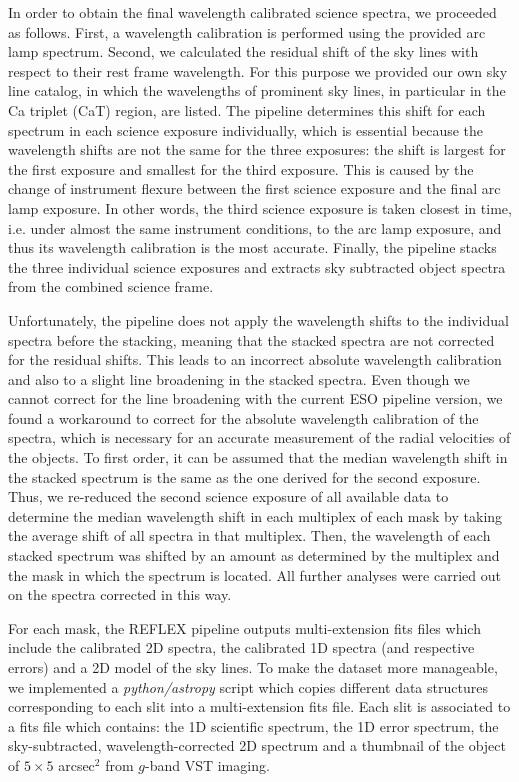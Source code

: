 \documentclass[useAMS,usenatbib]{mn2e}
\begin{document}
In order to obtain the final wavelength calibrated science spectra, we 
proceeded as follows. First, a wavelength calibration 
is performed using the provided arc lamp spectrum. Second, we calculated
the residual shift of the sky lines with respect to their rest frame 
wavelength. For this purpose we provided our own sky line catalog, in which 
the wavelengths of prominent sky lines, in particular in the Ca triplet (CaT)
region, are listed. The pipeline determines this shift for each spectrum in 
each science exposure individually, which is essential because the wavelength 
shifts are not the same for the three exposures: the shift is largest for the 
first exposure and smallest for the third exposure. This 
is caused by the 
change of instrument flexure between the first science exposure and the final 
arc lamp exposure. In other words, the third science exposure is taken 
closest in time, i.e. under almost the same instrument conditions, to the arc 
lamp exposure, and thus its wavelength calibration is the most accurate. 
Finally, the pipeline stacks the three individual science exposures and 
extracts sky subtracted object spectra from the combined science frame.

Unfortunately, the pipeline does not apply the wavelength 
shifts to the individual spectra before the stacking, meaning that the stacked
spectra are not corrected for the residual shifts. This leads to an incorrect
absolute wavelength calibration and also to a slight line broadening in the 
stacked spectra. Even though we cannot correct for the line broadening with
the current ESO pipeline version, we found a workaround to correct for the
absolute wavelength calibration of the spectra, which is necessary for an 
accurate measurement of the radial velocities of the objects. To first order, 
it can be assumed that the median wavelength shift in the stacked spectrum is 
the same as the one derived for the second exposure. Thus, we re-reduced the 
second science exposure of all available data to determine the median 
wavelength shift in each multiplex of each mask by taking the average shift 
of all spectra in that multiplex. Then, the wavelength of each stacked 
spectrum was shifted by an amount as determined by the multiplex and the mask
in which the spectrum is located. All further analyses were carried out 
on the spectra corrected in this way.

For each mask, the REFLEX pipeline outputs multi-extension fits files which 
include the calibrated 2D spectra, the calibrated 1D spectra (and respective 
errors) and a 2D model of the sky lines. To make the dataset more manageable, 
we implemented a {\it python/astropy} script which copies different data structures 
corresponding to each slit into a multi-extension fits file. Each slit is 
associated to a fits file which contains: the 1D scientific spectrum, the 1D 
error spectrum, the sky-subtracted, wavelength-corrected 2D spectrum and a 
thumbnail of the object of $5\times5$ arcsec$^2$ from $g$-band VST imaging. 
\end{document}
